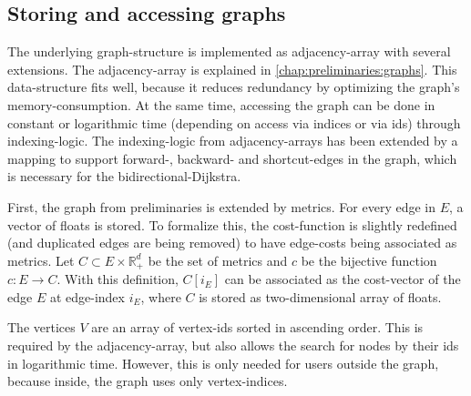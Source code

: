    \subsection{Storing and accessing graphs}
    \label{chap:balancing:implementation:graphs}

        The underlying graph-structure is implemented as adjacency-array with several extensions.
        The adjacency-array is explained in \cref{chap:preliminaries:graphs}.
        This data-structure fits well, because it reduces redundancy by optimizing the graph's memory-consumption.
        At the same time, accessing the graph can be done in constant or logarithmic time (depending on access via indices or via ids) through indexing-logic.
        The indexing-logic from adjacency-arrays has been extended by a mapping to support forward-, backward- and shortcut-edges in the graph, which is necessary for the bidirectional-Dijkstra.

        First, the graph from preliminaries is extended by metrics.
        For every edge in $E$, a vector of floats is stored.
        To formalize this, the cost-function is slightly redefined (and duplicated edges are being removed) to have edge-costs being associated as metrics.
        Let $C \subset E \times \mathbb{R}_+^d$ be the set of metrics and $c$ be the bijective function $c: E \to C$.
        With this definition, $C[i_E]$ can be associated as the cost-vector of the edge $E$ at edge-index $i_E$, where $C$ is stored as two-dimensional array of floats.

        The vertices $V$ are an array of vertex-ids sorted in ascending order.
        This is required by the adjacency-array, but also allows the search for nodes by their ids in logarithmic time.
        However, this is only needed for users outside the graph, because inside, the graph uses only vertex-indices.

